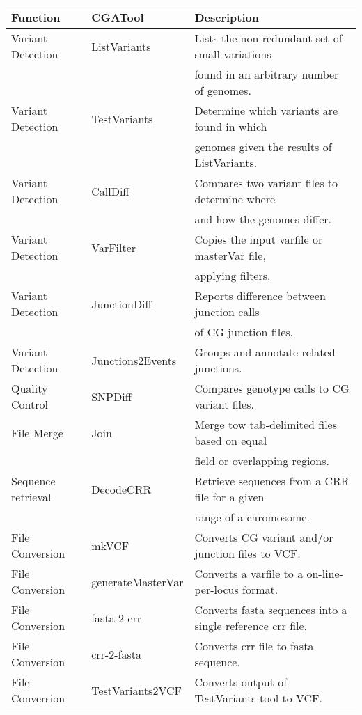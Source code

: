 \documentclass[10pt]{bmc_article}
\newenvironment{bmcformat}{\begin{raggedright}\baselineskip20pt\sloppy\setboolean{publ}{false}}{\end{raggedright}\baselineskip20pt\sloppy}
\begin{document}
\begin{bmcformat}
{\begin{tabular}{l|l|l}
        \textbf{Function} & \textbf{CGATool}  & \textbf{Description} \\ \hline         
        Variant Detection & ListVariants & Lists the non-redundant set of small variations  \\ 
	                  &              & found in an arbitrary number of genomes. \\ \hline
        Variant Detection & TestVariants & Determine which variants are found in which   \\ 
                          &              & genomes given the results of ListVariants. \\ \hline
        Variant Detection & CallDiff     & Compares two variant files to determine where \\
                          &              & and how the genomes differ. \\ \hline
        Variant Detection & VarFilter    & Copies the input varfile or masterVar file, \\
                          &              & applying filters. \\ \hline	
        Variant Detection & JunctionDiff & Reports difference between junction calls \\
                          &              & of CG junction files. \\ \hline
        Variant Detection & Junctions2Events & Groups and annotate related junctions. \\ \hline
        Quality Control   & SNPDiff      & Compares genotype calls to CG variant files. \\ \hline
        File Merge        & Join         & Merge tow tab-delimited files based on equal \\
                          &              & field or overlapping regions. \\ \hline
        Sequence retrieval& DecodeCRR    & Retrieve sequences from a CRR file for a given \\
                          &              & range of a chromosome. \\ \hline
        File Conversion   & mkVCF        & Converts CG variant and/or junction files to VCF. \\ \hline
        File Conversion   & generateMasterVar & Converts a varfile to a on-line-per-locus format. \\ \hline
        File Conversion   & fasta-2-crr  & Converts fasta sequences into a single reference crr file. \\ \hline
        File Conversion   & crr-2-fasta  & Converts crr file to fasta sequence. \\ \hline
        File Conversion   & TestVariants2VCF & Converts output of TestVariants tool to VCF. \\ 
        
      \end{tabular}
      }
  
\end{bmcformat}
\end{document}
